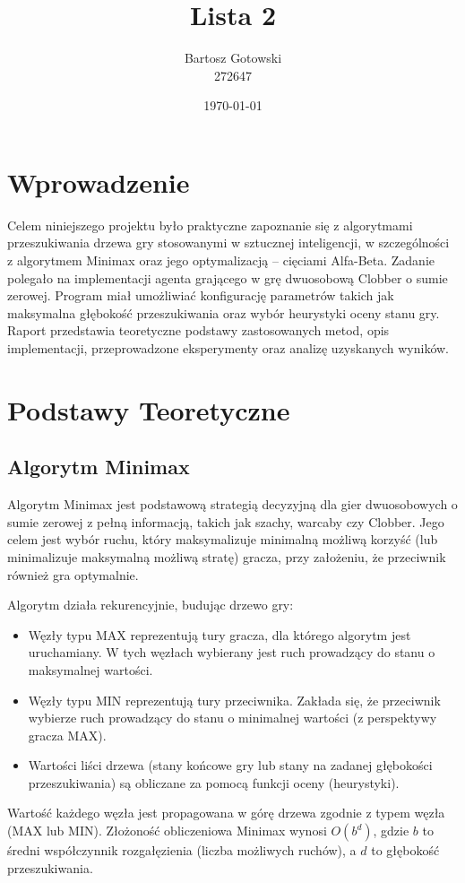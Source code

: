 \documentclass[11pt,a4paper]{article}
\title{Lista 2}
\author{Bartosz Gotowski \\ 272647}
\date{\today}
\begin{document}
\maketitle

\tableofcontents
\clearpage

\section{Wprowadzenie}
Celem niniejszego projektu było praktyczne zapoznanie się z algorytmami przeszukiwania drzewa gry stosowanymi w sztucznej inteligencji, w szczególności z algorytmem Minimax oraz jego optymalizacją – cięciami Alfa-Beta. Zadanie polegało na implementacji agenta grającego w grę dwuosobową Clobber o sumie zerowej. Program miał umożliwiać konfigurację parametrów takich jak maksymalna głębokość przeszukiwania oraz wybór heurystyki oceny stanu gry. Raport przedstawia teoretyczne podstawy zastosowanych metod, opis implementacji, przeprowadzone eksperymenty oraz analizę uzyskanych wyników.

\section{Podstawy Teoretyczne}
\subsection{Algorytm Minimax}
Algorytm Minimax jest podstawową strategią decyzyjną dla gier dwuosobowych o sumie zerowej z pełną informacją, takich jak szachy, warcaby czy Clobber. Jego celem jest wybór ruchu, który maksymalizuje minimalną możliwą korzyść (lub minimalizuje maksymalną możliwą stratę) gracza, przy założeniu, że przeciwnik również gra optymalnie.

Algorytm działa rekurencyjnie, budując drzewo gry:
\begin{itemize}
    \item Węzły typu MAX reprezentują tury gracza, dla którego algorytm jest uruchamiany. W tych węzłach wybierany jest ruch prowadzący do stanu o maksymalnej wartości.
    \item Węzły typu MIN reprezentują tury przeciwnika. Zakłada się, że przeciwnik wybierze ruch prowadzący do stanu o minimalnej wartości (z perspektywy gracza MAX).
    \item Wartości liści drzewa (stany końcowe gry lub stany na zadanej głębokości przeszukiwania) są obliczane za pomocą funkcji oceny (heurystyki).
\end{itemize}
Wartość każdego węzła jest propagowana w górę drzewa zgodnie z typem węzła (MAX lub MIN). Złożoność obliczeniowa Minimax wynosi $O(b^d)$, gdzie $b$ to średni współczynnik rozgałęzienia (liczba możliwych ruchów), a $d$ to głębokość przeszukiwania.
\end{document}

